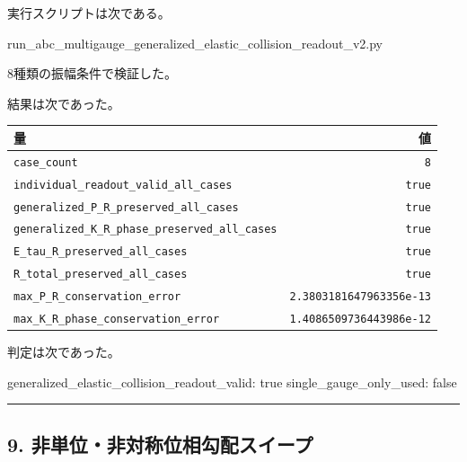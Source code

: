 \documentclass[
  a4paper,
]{article}
\newenvironment{Shaded}{}{}
\newcommand{\NormalTok}[1]{#1}
\newcounter{none} %
\begin{document}
実行スクリプトは次である。

\begin{Shaded}
\begin{Highlighting}[]
\NormalTok{run\_abc\_multigauge\_generalized\_elastic\_collision\_readout\_v2.py}
\end{Highlighting}
\end{Shaded}

8種類の振幅条件で検証した。

結果は次であった。

{\def\LTcaptype{none} %
\begin{longtable}[]{@{}lr@{}}
\toprule\noalign{}
量 & 値 \\
\midrule\noalign{}
\endhead
\bottomrule\noalign{}
\endlastfoot
\texttt{case\_count} & \texttt{8} \\
\texttt{individual\_readout\_valid\_all\_cases} & \texttt{true} \\
\texttt{generalized\_P\_R\_preserved\_all\_cases} & \texttt{true} \\
\texttt{generalized\_K\_R\_phase\_preserved\_all\_cases} &
\texttt{true} \\
\texttt{E\_tau\_R\_preserved\_all\_cases} & \texttt{true} \\
\texttt{R\_total\_preserved\_all\_cases} & \texttt{true} \\
\texttt{max\_P\_R\_conservation\_error} &
\texttt{2.3803181647963356e-13} \\
\texttt{max\_K\_R\_phase\_conservation\_error} &
\texttt{1.4086509736443986e-12} \\
\end{longtable}
}

判定は次であった。

\begin{Shaded}
\begin{Highlighting}[]
\NormalTok{generalized\_elastic\_collision\_readout\_valid: true}
\NormalTok{single\_gauge\_only\_used: false}
\end{Highlighting}
\end{Shaded}

\begin{center}\rule{0.5\linewidth}{0.5pt}\end{center}

\subsection{9.
非単位・非対称位相勾配スイープ}\label{ux975eux5358ux4f4dux975eux5bfeux79f0ux4f4dux76f8ux52feux914dux30b9ux30a4ux30fcux30d7}
\end{document}
